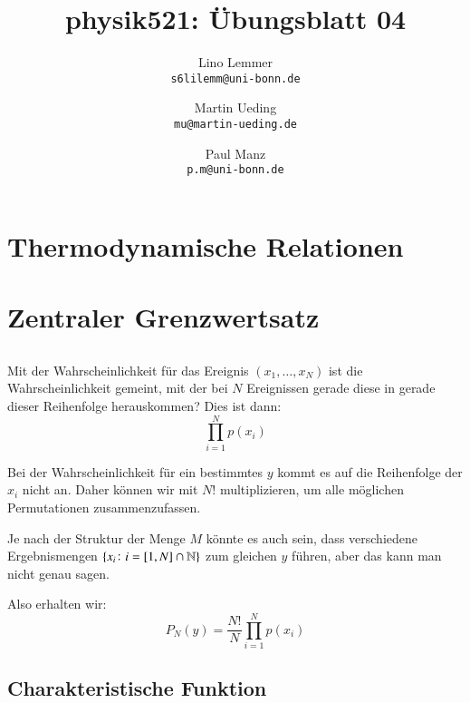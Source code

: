 

\setcounter{section}{0}
\renewcommand\thesection{H\,4.\arabic{section}}
\renewcommand\thesubsection{\thesection.\alph{subsection}}

\title{physik521: Übungsblatt 04}
\author{%
    Lino Lemmer \\ \small{\texttt{s6lilemm@uni-bonn.de}}
    \and
    Martin Ueding \\ \small{\texttt{mu@martin-ueding.de}}
    \and
    Paul Manz \\ \small{\texttt{p.m@uni-bonn.de}}
}


\maketitle

\section{Thermodynamische Relationen}

\section{Zentraler Grenzwertsatz}

\subsection{}

Mit der Wahrscheinlichkeit für das Ereignis $(x_1, \ldots, x_N)$ ist die
Wahrscheinlichkeit gemeint, mit der bei $N$ Ereignissen gerade diese in gerade
dieser Reihenfolge herauskommen? Dies ist dann:
\[
    \prod_{i=1}^N p(x_i)
\]

Bei der Wahrscheinlichkeit für ein bestimmtes $y$ kommt es auf die Reihenfolge
der $x_i$ nicht an. Daher können wir mit $N!$ multiplizieren, um alle möglichen
Permutationen zusammenzufassen.

Je nach der Struktur der Menge $M$ könnte es auch sein, dass verschiedene
Ergebnismengen $\set{x_i \colon i = [1, N] \cap \mathbb N}$ zum gleichen $y$
führen, aber das kann man nicht genau sagen.

Also erhalten wir:
\[
    P_N(y) = \frac{N!}{N} \prod_{i=1}^N p(x_i)
\]

\subsection{Charakteristische Funktion}


